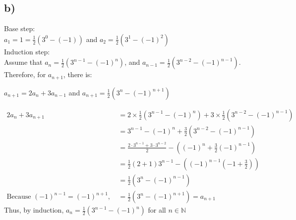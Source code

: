 \documentclass{article}
\begin{document}
    \subsection*{b)}
        Base step:\\
        \(a_1=1=\frac{1}{2} (3^0-(-1))\) and \(a_2=\frac{1}{2} (3^1-(-1)^2)\)\\
        Induction step:\\
        Assume that \(a_n=\frac{1}{2}(3^{n-1}-(-1)^n)\), and \(a_{n-1}=\frac{1}{2}(3^{n-2}-(-1)^{n-1})\).\\
        Therefore, for \(a_{n+1}\), there is:\\
        \begin{center}
            \(a_{n+1}=2a_n+3a_{n-1}\) and \(a_{n+1}=\frac{1}{2}(3^{n}-(-1)^{n+1})\)
        \end{center}
        \begin{align*}
            2a_n+3a_{n+1}&=2\times\frac{1}{2}(3^{n-1}-(-1)^n)+3\times \frac{1}{2}(3^{n-2}-(-1)^{n-1})\\
            &=3^{n-1}-(-1)^n+\frac{3}{2}(3^{n-2}-(-1)^{n-1})\\
            &=\frac{2\cdot 3^{n-1}+3\cdot3^{n-2}}{2}-\left((-1)^{n}+\frac{3}{2}(-1)^{n-1}\right)\\
            &=\frac{1}{2}(2+1)3^{n-1}-((-1)^{n-1}(-1+\frac{3}{2}))\\
            &=\frac{1}{2}(3^n-(-1)^{n-1})\\
            \text{Because }(-1)^{n-1}=(-1)^{n+1}, \ &=\frac{1}{2}(3^n-(-1)^{n+1})=a_{n+1}
        \end{align*}
        Thus, by induction, \(a_n=\frac{1}{2}(3^{n-1}-(-1)^n)\) for all \(n\in \mathbb{N}\)
\end{document}
